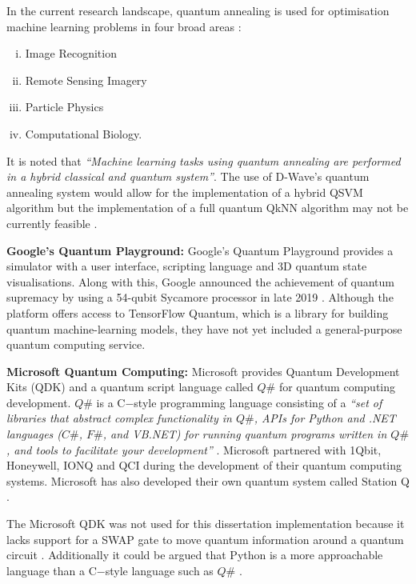 In the current research landscape, quantum annealing is used for optimisation machine learning problems in four broad areas \citep{nath2021review}:
\begin{enumerate}[(i)]
\item Image Recognition
\item Remote Sensing Imagery 
\item Particle Physics 
\item Computational Biology. 
\end{enumerate}
It is noted that \emph{``Machine learning tasks using quantum annealing are performed in a hybrid classical and quantum system''}. The use of D-Wave's quantum annealing system would allow for the implementation of a hybrid QSVM algorithm but the implementation of a full quantum QkNN algorithm may not be currently feasible \citep{nath2021review}. %

\textbf{Google’s Quantum Playground:} Google's Quantum Playground provides a simulator with a user interface, scripting language and 3D quantum state visualisations. Along with this, Google announced the achievement of quantum supremacy by using a 54-qubit Sycamore processor in late 2019 \citep{QCloudC}.  %
Although the platform offers access to TensorFlow Quantum, which is a library for building quantum machine-learning models, they have not yet included a general-purpose quantum computing service.


\textbf{Microsoft Quantum Computing:}  Microsoft provides 
Quantum Development Kits (QDK) and a quantum script language called $Q\#$ for quantum computing development.  $Q\#$ is a C$-$style programming language consisting of a \emph{``set of libraries that abstract complex functionality in $Q\#$, APIs for Python and .NET languages ($C\#$, $F\#$, and VB.NET) for running quantum programs written in $Q\#$, and tools to facilitate your development''} \citep{LaRos2019}. Microsoft partnered with 1Qbit, Honeywell, IONQ and QCI during the development of their quantum computing systems. Microsoft has also developed their own quantum system called Station Q \citep{QCloudC}.

The Microsoft QDK was not used for this dissertation implementation because it lacks support for a SWAP gate to move quantum information around a quantum circuit \citep{LaRos2019}.
Additionally it could be argued that Python is a more approachable language than a C$-$style language such as $Q\#$ . %

